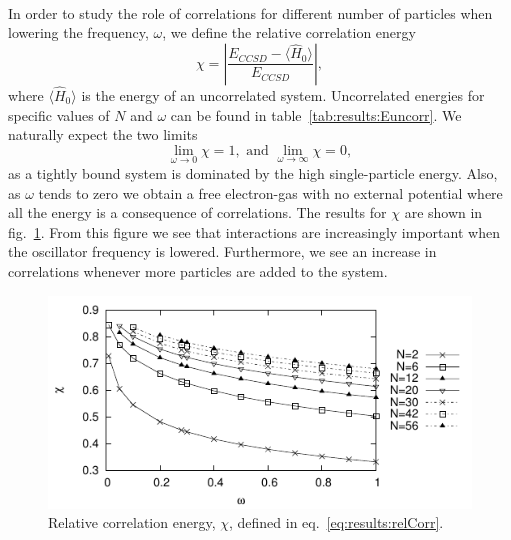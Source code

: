 \paragraph{}
In order to study the role of correlations for different number of particles when lowering the frequency, $\omega$, we define the relative correlation energy
\begin{equation}
\label{eq:results:relCorr}
\chi = \left|  \frac{E_{CCSD} - \langle \hat{H}_0 \rangle}{E_{CCSD}}  \right| ,
\end{equation}
where $\langle \hat{H}_0 \rangle $ is the energy of an uncorrelated system. 
Uncorrelated energies for specific values of $N$ and $\omega$ can be found in table~\ref{tab:results:Euncorr}.
We naturally expect the two limits
\begin{equation}
\lim_{\omega \rightarrow 0} \chi = 1,
\textrm{ and }
\lim_{\omega \rightarrow \infty} \chi = 0,
\end{equation}
as a tightly bound system is dominated by the high single-particle energy.
Also, as $\omega$ tends to zero we obtain a free electron-gas with no external potential where all the energy is a consequence of correlations.
The results for $\chi$ are shown in fig.~\ref{fig:results:relCorr}.
From this figure we see that interactions are increasingly important when the oscillator frequency is lowered.
Furthermore, we see an increase in correlations whenever more particles are added to the system.
\begin{figure}
\begin{center}
\includegraphics[scale=1.3]{../10-results/figs/loweringOmega/correlationAllZoom.pdf}
\caption{Relative correlation energy, $\chi$, defined in eq.~\ref{eq:results:relCorr}.}
\label{fig:results:relCorr}
\end{center}
\end{figure}


